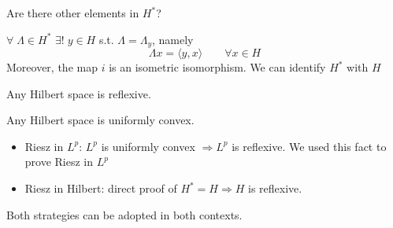 Are there other elements in \(H^*\)?

\begin{theorem}
    \(\forall \; \Lambda \in H^* \) \(\exists! \; y \in H\) s.t. \(\Lambda = \Lambda_y\), namely
    \[
        \Lambda x = \langle y, x\rangle   \qquad \forall x \in H
    \]
    Moreover, the map \(i\) is an isometric isomorphism. We can identify \(H^*\) with \(H\)
\end{theorem}

\begin{corollary}
    Any Hilbert space is reflexive. 
\end{corollary}
\begin{remark}
    Any Hilbert space is uniformly convex.
\end{remark}

\begin{itemize}
    \item Riesz in \(L^p\): \(L^p \) is uniformly convex \(\Rightarrow L^p\) is reflexive. We used this fact to prove Riesz in \(L^p\)
    \item Riesz in Hilbert: direct proof of \(H^* = H \Rightarrow H\) is reflexive.
\end{itemize}
Both strategies can be adopted in both contexts.


